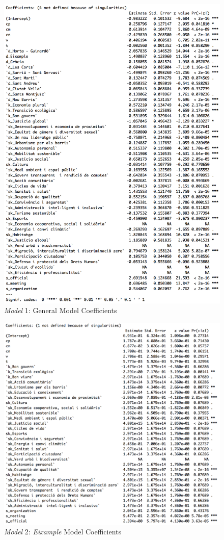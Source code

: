 \begin{figure}[H]
\centering
\includegraphics[width=\textwidth]{Figures/coef_model_1.png}
\caption{\emph{Model} 1: General Model Coefficients}
\label{coef:model_1}
\end{figure}

\begin{figure}[h]
\centering
\includegraphics[width=\textwidth]{Figures/coef_model_2.png}
\caption{\emph{Model} 2: \emph{Eixample} Model Coefficients}
\label{coef:model_2}
\end{figure}


\newpage

